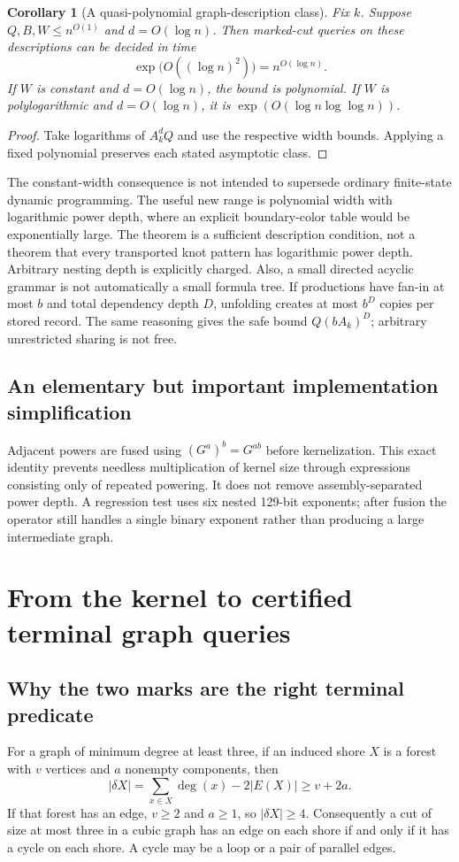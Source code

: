 \documentclass[11pt]{article}
\newtheorem{corollary}[theorem]{Corollary}
\theoremstyle{remark}\newtheorem{remark}[theorem]{Remark}
\begin{document}
\begin{corollary}[A quasi-polynomial graph-description class]\label{cor:qp}
Fix $k$. Suppose $Q,B,W\le n^{O(1)}$ and $d=O(\log n)$. Then marked-cut queries on these descriptions can be decided in time
\[
 \exp\bigl(O((\log n)^2)\bigr)=n^{O(\log n)}.
\]
If $W$ is constant and $d=O(\log n)$, the bound is polynomial. If $W$ is polylogarithmic and $d=O(\log n)$, it is $\exp(O(\log n\log\log n))$.
\end{corollary}
\begin{proof}
Take logarithms of $A_k^d Q$ and use the respective width bounds. Applying a fixed polynomial preserves each stated asymptotic class.
\end{proof}
The constant-width consequence is not intended to supersede ordinary finite-state dynamic programming. The useful new range is polynomial width with logarithmic power depth, where an explicit boundary-color table would be exponentially large. The theorem is a sufficient description condition, not a theorem that every transported knot pattern has logarithmic power depth. Arbitrary nesting depth is explicitly charged. Also, a small directed acyclic grammar is not automatically a small formula tree. If productions have fan-in at most $b$ and total dependency depth $D$, unfolding creates at most $b^D$ copies per stored record. The same reasoning gives the safe bound $Q(bA_k)^D$; arbitrary unrestricted sharing is not free.

\subsection{An elementary but important implementation simplification}
Adjacent powers are fused using $(G^a)^b=G^{ab}$ before kernelization. This exact identity prevents needless multiplication of kernel size through expressions consisting only of repeated powering. It does not remove assembly-separated power depth. A regression test uses six nested 129-bit exponents; after fusion the operator still handles a single binary exponent rather than producing a large intermediate graph.

\section{From the kernel to certified terminal graph queries}
\subsection{Why the two marks are the right terminal predicate}
For a graph of minimum degree at least three, if an induced shore $X$ is a forest with $v$ vertices and $a$ nonempty components, then
\[
 |\delta X|=\sum_{x\in X}\deg(x)-2|E(X)|\ge v+2a.
\]
If that forest has an edge, $v\ge2$ and $a\ge1$, so $|\delta X|\ge4$. Consequently a cut of size at most three in a cubic graph has an edge on each shore if and only if it has a cycle on each shore. A cycle may be a loop or a pair of parallel edges.
\end{document}
